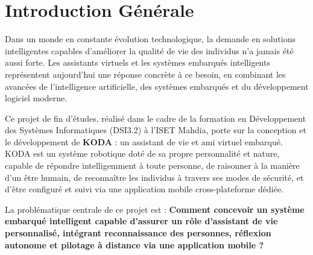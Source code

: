 \documentclass[a4paper,12pt]{report}
\begin{document}
	\clearpage
	\pagestyle{mainStyle}
	\setcounter{page}{1}
	
	\chapter*{Introduction Générale}
	
	Dans un monde en constante évolution technologique, la demande en solutions intelligentes capables d'améliorer la qualité de vie des individus n'a jamais été aussi forte. Les assistants virtuels et les systèmes embarqués intelligents représentent aujourd'hui une réponse concrète à ce besoin, en combinant les avancées de l'intelligence artificielle, des systèmes embarqués et du développement logiciel moderne.
	
	Ce projet de fin d'études, réalisé dans le cadre de la formation en Développement des Systèmes Informatiques (DSI3.2) à l'ISET Mahdia, porte sur la conception et le développement de \textbf{KODA} : un assistant de vie et ami virtuel embarqué. KODA est un système robotique doté de sa propre personnalité et nature, capable de répondre intelligemment à toute personne, de raisonner à la manière d'un être humain, de reconnaître les individus à travers ses modes de sécurité, et d'être configuré et suivi via une application mobile cross-plateforme dédiée.
	
	La problématique centrale de ce projet est : \textbf{Comment concevoir un système embarqué intelligent capable d'assurer un rôle d'assistant de vie personnalisé, intégrant reconnaissance des personnes, réflexion autonome et pilotage à distance via une application mobile ?}
	
\end{document}
